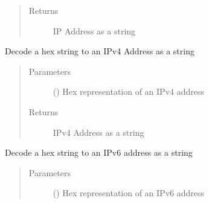 \documentclass[letterpaper,10pt,english]{sphinxmanual}
\begin{document}
\begin{fulllineitems}
\begin{fulllineitems}
\begin{quote}
\begin{description}
\item[{Returns}] \leavevmode
\sphinxAtStartPar
IP Address as a string

\end{description}\end{quote}

\end{fulllineitems}


\begin{fulllineitems}
\label{\detokenize{dhcp_decode-class:bloxone.dhcp_decode.hex_to_ipv4_address}}
\sphinxAtStartPar
Decode a hex string to an IPv4 Address as a string
\begin{quote}\begin{description}
\item[{Parameters}] \leavevmode
\sphinxAtStartPar
{} () \textendash{} Hex representation of an IPv4 address

\item[{Returns}] \leavevmode
\sphinxAtStartPar
IPv4 Address as a string

\end{description}\end{quote}

\end{fulllineitems}


\begin{fulllineitems}
\label{\detokenize{dhcp_decode-class:bloxone.dhcp_decode.hex_to_ipv6_address}}
\sphinxAtStartPar
Decode a hex string to an IPv6 address as a string
\begin{quote}\begin{description}
\item[{Parameters}] \leavevmode
\sphinxAtStartPar
{} () \textendash{} Hex representation of an IPv6 address


\end{description}
\end{quote}
\end{fulllineitems}
\end{fulllineitems}
\end{document}
